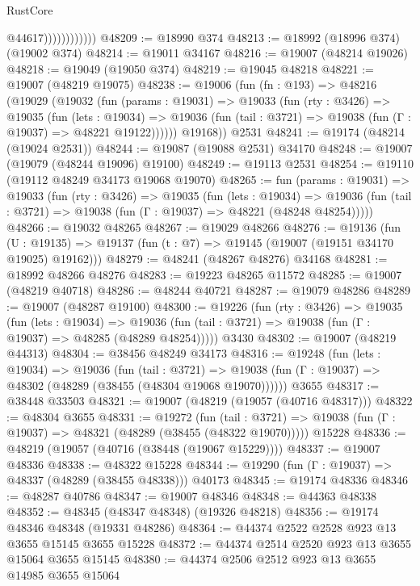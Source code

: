 \begin{lexlean}{RustCore}
\begin{coremodule}
                            @44617))))))))))))
@48209 := @18990 @374
@48213 := @18992 (@18996 @374) (@19002 @374)
@48214 := @19011 @34167
@48216 := @19007 (@48214 @19026)
@48218 := @19049 (@19050 @374)
@48219 := @19045 @48218
@48221 := @19007 (@48219 @19075)
@48238 := @19006
    (fun (fn : @193) =>
    @48216
      (@19029
        (@19032
          (fun (params : @19031) =>
          @19033
            (fun (rty : @3426) =>
            @19035
              (fun (lets : @19034) =>
              @19036 (fun (tail : @3721) => @19038 (fun (Γ : @19037) => @48221 @19122))))))
        @19168))
    @2531
@48241 := @19174 (@48214 (@19024 @2531))
@48244 := @19087 (@19088 @2531) @34170
@48248 := @19007 (@19079 (@48244 @19096) @19100)
@48249 := @19113 @2531
@48254 := @19110 (@19112 @48249 @34173 @19068 @19070)
@48265 := fun (params : @19031) =>
  @19033
    (fun (rty : @3426) =>
    @19035
      (fun (lets : @19034) =>
      @19036 (fun (tail : @3721) => @19038 (fun (Γ : @19037) => @48221 (@48248 @48254)))))
@48266 := @19032 @48265
@48267 := @19029 @48266
@48276 := @19136
    (fun (U : @19135) => @19137 (fun (t : @7) => @19145 (@19007 (@19151 @34170 @19025) @19162)))
@48279 := @48241 (@48267 @48276) @34168
@48281 := @18992 @48266 @48276
@48283 := @19223 @48265 @11572
@48285 := @19007 (@48219 @40718)
@48286 := @48244 @40721
@48287 := @19079 @48286
@48289 := @19007 (@48287 @19100)
@48300 := @19226
    (fun (rty : @3426) =>
    @19035
      (fun (lets : @19034) =>
      @19036 (fun (tail : @3721) => @19038 (fun (Γ : @19037) => @48285 (@48289 @48254)))))
    @3430
@48302 := @19007 (@48219 @44313)
@48304 := @38456 @48249 @34173
@48316 := @19248
    (fun (lets : @19034) =>
    @19036
      (fun (tail : @3721) =>
      @19038 (fun (Γ : @19037) => @48302 (@48289 (@38455 (@48304 @19068 @19070))))))
    @3655
@48317 := @38448 @33503
@48321 := @19007 (@48219 (@19057 (@40716 @48317)))
@48322 := @48304 @3655
@48331 := @19272
    (fun (tail : @3721) => @19038 (fun (Γ : @19037) => @48321 (@48289 (@38455 (@48322 @19070)))))
    @15228
@48336 := @48219 (@19057 (@40716 (@38448 (@19067 @15229))))
@48337 := @19007 @48336
@48338 := @48322 @15228
@48344 := @19290 (fun (Γ : @19037) => @48337 (@48289 (@38455 @48338))) @40173
@48345 := @19174 @48336
@48346 := @48287 @40786
@48347 := @19007 @48346
@48348 := @44363 @48338
@48352 := @48345 (@48347 @48348) (@19326 @48218)
@48356 := @19174 @48346 @48348 (@19331 @48286)
@48364 := @44374 @2522 @2528 @923 @13 @3655 @15145 @3655 @15228
@48372 := @44374 @2514 @2520 @923 @13 @3655 @15064 @3655 @15145
@48380 := @44374 @2506 @2512 @923 @13 @3655 @14985 @3655 @15064

\end{coremodule}
\end{lexlean}
